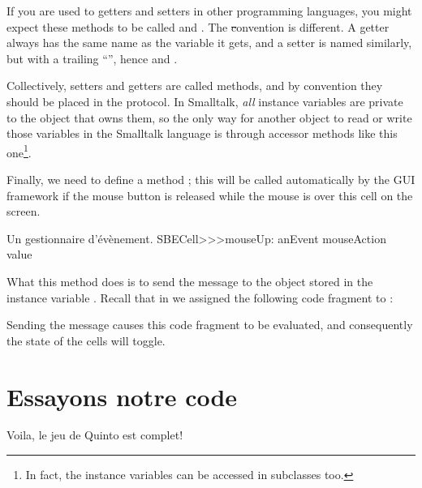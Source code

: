 \documentclass[a4paper,10pt,twoside]{book}
\begin{document}
If you are used to getters and setters in other programming languages, you might expect these methods to be called  and .
The \st convention is different.
A getter always has the same name as the variable it gets, and a setter is named similarly, but with a trailing ``\ct{:}'', hence  and .

Collectively, setters and getters are called   methods, and by convention they should be placed in the  protocol.
In Smalltalk, \emph{all} instance variables are private to the object that owns them, so the only way for another object to read or write those variables in the Smalltalk language is through accessor methods like this one\footnote{In fact, the instance variables can be accessed in subclasses too.}.


Finally, we need to define a method ; this will be called automatically by the GUI framework if the mouse button is released while the mouse is over this cell on the screen.

\begin{method}[sbecellmouseup]{Un gestionnaire d'évènement.}
SBECell>>>mouseUp: anEvent
   mouseAction value
\end{method}


What this method does is to send the message  to the object stored in the instance variable . 
Recall that in  we assigned the following code fragment to :


\noindent
Sending the  message causes this code fragment to be evaluated, and consequently the state of the cells will toggle.

\section{Essayons notre code}

Voila, le jeu de Quinto est complet!
\end{document}
